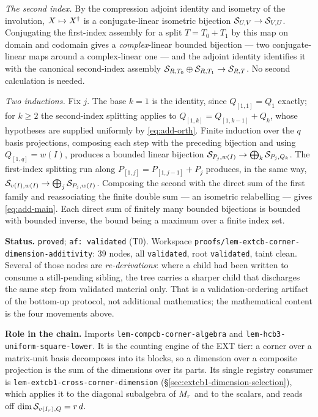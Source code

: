 \emph{The second index.} By the compression adjoint identity and isometry of the
involution, $X\mapsto X^{\dagger}$ is a conjugate-linear isometric bijection
$\mathcal S_{U,V}\to\mathcal S_{V,U}$. Conjugating the first-index assembly for a split
$T=T_0+T_1$ by this map on domain and codomain gives a \emph{complex}-linear bounded
bijection --- two conjugate-linear maps around a complex-linear one --- and the adjoint
identity identifies it with the canonical second-index assembly
$\mathcal S_{R,T_0}\oplus\mathcal S_{R,T_1}\to\mathcal S_{R,T}$. No second calculation is needed.

\emph{Two inductions.} Fix $j$. The base $k=1$ is the identity, since $Q_{[1,1]}=Q_1$
exactly; for $k\ge2$ the second-index splitting applies to
$Q_{[1,k]}=Q_{[1,k-1]}+Q_k$, whose hypotheses are supplied uniformly by
\eqref{eq:add-orth}. Finite induction over the $q$ basis projections, composing each step
with the preceding bijection and using $Q_{[1,q]}=w(I)$, produces a bounded linear
bijection $\mathcal S_{P_j,w(I)}\to\bigoplus_k\mathcal S_{P_j,Q_k}$. The first-index splitting run
along $P_{[1,j]}=P_{[1,j-1]}+P_j$ produces, in the same way,
$\mathcal S_{v(I),w(I)}\to\bigoplus_j\mathcal S_{P_j,w(I)}$. Composing the second with the direct sum
of the first family and reassociating the finite double sum --- an isometric relabelling
--- gives \eqref{eq:add-main}. Each direct sum of finitely many bounded bijections is
bounded with bounded inverse, the bound being a maximum over a finite index set.

\medskip
\noindent\textbf{Status.} \texttt{proved}; \texttt{af: validated} (T0). Workspace
\texttt{proofs/lem-extcb-corner-dimension-additivity}: 39 nodes, all \texttt{validated},
root \texttt{validated}, taint clean. Several of those nodes are \emph{re-derivations}:
where a child had been written to consume a still-pending sibling, the tree carries a
sharper child that discharges the same step from validated material only. That is a
validation-ordering artifact of the bottom-up protocol, not additional mathematics; the
mathematical content is the four movements above.

\noindent\textbf{Role in the chain.} Imports \texttt{lem-compcb-corner-algebra} and
\texttt{lem-hcb3-uniform-square-lower}. It is the counting engine of the EXT tier: a
corner over a matrix-unit basis decomposes into its blocks, so a dimension over a
composite projection is the sum of the dimensions over its parts. Its single registry
consumer is \texttt{lem-extcb1-cross-corner-dimension}
(\S\ref{sec:extcb1-dimension-selection}), which applies it to the diagonal subalgebra of
$M_{r}$ and to the scalars, and reads off $\dim\mathcal S_{v(I_r),Q}=r\,d$.
